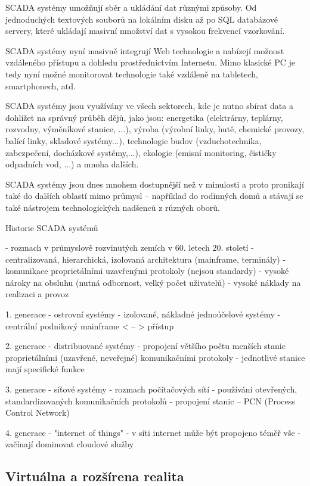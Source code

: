 \documentclass[]{tukediphc}
\begin{document}
SCADA systémy umožňují sběr a ukládání dat různými způsoby. Od jednoduchých textových souborů na lokálním disku až po SQL databázové servery, které ukládají masivní množství dat s vysokou frekvencí vzorkování.

SCADA systémy nyní masivně integrují Web technologie a nabízejí možnost vzdáleného přístupu a dohledu prostřednictvím Internetu. Mimo klasické PC je tedy nyní možné monitorovat technologie také vzdáleně na tabletech, smartphonech, atd.

SCADA systémy jsou využívány ve všech sektorech, kde je nutno sbírat data a dohlížet na správný průběh dějů, jako jsou: energetika (elektrárny, teplárny, rozvodny, výměníkové stanice, ...), výroba (výrobní linky, hutě, chemické provozy, balící linky, skladové systémy...), technologie budov (vzduchotechnika, zabezpečení, docházkové systémy,...), ekologie (emisní monitoring, čističky odpadních vod, ...) a mnoha dalších.

SCADA systémy jsou dnes mnohem dostupnější než v minulosti a proto pronikají také do dalších oblastí mimo průmysl – například do rodinných domů a stávají se také nástrojem technologických nadšenců z různých oborů.



Historie SCADA systémů

- rozmach v průmyslově rozvinutých zemích v 60. letech 20. století
- centralizovaná, hierarchická, izolovaná architektura (mainframe, terminály)
- komunikace proprietálními uzavřenými protokoly (nejsou standardy)
- vysoké nároky na obsluhu (nutná odbornost, velký počet uživatelů)
- vysoké náklady na realizaci a provoz

1. generace - ostrovní systémy
- izolované, nákladné jednoúčelové systémy
- centrální podnikový mainframe < – > přístup

2. generace - distribuované systémy
- propojení většího počtu menších stanic proprietálními (uzavřené, neveřejné) komunikačními protokoly
- jednotlivé stanice mají specifické funkce

3. generace - síťové systémy
- rozmach počítačových sítí
- používání otevřených, standardizovaných komunikačních protokolů
- propojení stanic – PCN (Process Control Network)

4. generace - "internet of things"
- v síti internet může být propojeno téměř vše
- začínají dominovat cloudové služby

\subsection{Virtuálna a rozšírena realita}
\end{document}
